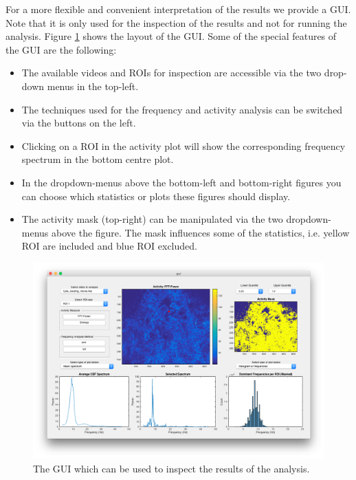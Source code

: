 \documentclass[11pt]{scrartcl}
\begin{document}
For a more flexible and convenient interpretation of the results we provide a GUI. Note that it is only used for the inspection of the results and not for running the analysis. Figure \ref{fig:gui} shows the layout of the GUI. Some of the special features of the GUI are the following:
\begin{itemize}
\item The available videos and ROIs for inspection are accessible via the two drop-down menus in the top-left.
\item The techniques used for the frequency and activity analysis can be switched via the buttons on the left.
\item Clicking on a ROI in the activity plot will show the corresponding frequency spectrum in the bottom centre plot.
\item In the dropdown-menus above the bottom-left and bottom-right figures you can choose which statistics or plots these figures should display.
\item The activity mask (top-right) can be manipulated via the two dropdown-menus above the figure. The mask influences some of the statistics, i.e. yellow ROI are included and blue ROI excluded.
\end{itemize}
 

\begin{figure}[h]
  \centering
  \includegraphics[width=\linewidth]{GUI}
  \caption{The GUI which can be used to inspect the results of the analysis.}
  \label{fig:gui}
\end{figure}

\end{document}
